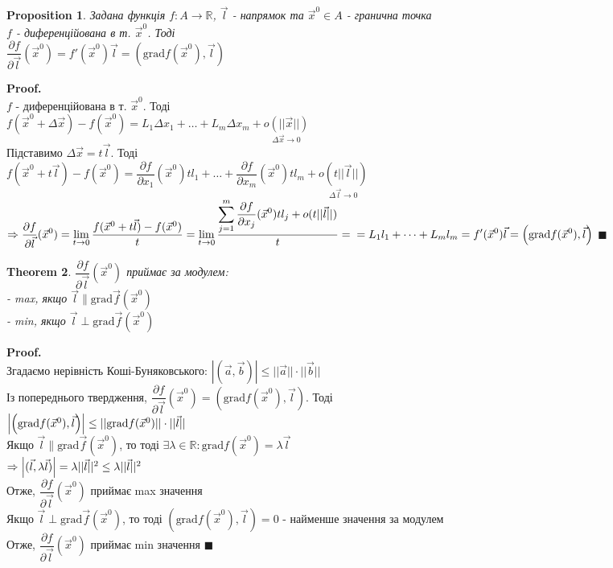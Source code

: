 \documentclass[a4paper, 14pt]{extarticle}
\def\huge{\displaystyle}
\theoremstyle{theoremdd}
\newtheorem{theorem}{Theorem}[subsection]
\theoremstyle{theoremdd}
\theoremstyle{theoremdd}
\newtheorem{proposition}[theorem]{Proposition}
\theoremstyle{theoremdd}
\theoremstyle{theoremdd}
\theoremstyle{theoremdd}
\theoremstyle{theoremdd}
\newenvironment{pf}{\vspace*{-3mm} \textbf{Proof. \\}}{$\blacksquare$}
\begin{document}
\begin{proposition}
Задана функція $f: A \to \mathbb{R}$, $\vec{l}$ - напрямок та $\vec{x}^0 \in A$ - гранична точка\\
$f$ - диференційована в т. $\vec{x}^0$. Тоді\\
$\dfrac{\partial f}{\partial \vec{l}}(\vec{x}^0) = f'(\vec{x}^0) \vec{l} = \left(\textrm{grad} f(\vec{x}^0), \vec{l} \right)$
\end{proposition}
\begin{pf}
$f$ - диференційована в т. $\vec{x}^0$. Тоді \\ $f(\vec{x}^0 + \Delta \vec{x}) - f(\vec{x}^0) = L_1 \Delta x_1 + \dots + L_m \Delta x_m + \underset{\Delta \vec{x} \to 0}{o(||\vec{x}||)}$\\
Підставимо $\Delta \vec{x} = t \vec{l}$. Тоді\\
$f(\vec{x}^0 + t \vec{l}) - f(\vec{x}^0) = \dfrac{\partial f}{\partial x_1} (\vec{x}^0) tl_1 + \dots + \dfrac{\partial f}{\partial x_m} (\vec{x}^0) t l_m + \underset{\Delta \vec{l} \to 0}{o(t || \vec{l}||)}$\\
$\Rightarrow \huge \dfrac{\partial f}{\partial \vec{l}}(\vec{x}^0) = \lim_{t \to 0} \dfrac{f(\vec{x}^0 + t \vec{l}) - f(\vec{x}^0)}{t} = \lim_{t \to 0} \dfrac{\huge \sum_{j=1}^m \dfrac{\partial f}{\partial x_j}(\vec{x}^0)tl_j + o(t||\vec{l}||)}{t} = \\ = L_1 l_1 + \dots + L_m l_m = f'(\vec{x}^0) \vec{l} = \left( \textrm{grad} f(\vec{x}^0), \vec{l} \right)$
\end{pf}

\begin{theorem}
$\dfrac{\partial f}{\partial \vec{l}}(\vec{x}^0)$ приймає за модулем:\\
- max, якщо $\vec{l} \parallel \textrm{grad} \vec{f}(\vec{x}^0)$\\
- min, якщо $\vec{l} \perp \textrm{grad} \vec{f}(\vec{x}^0)$
\end{theorem}
\begin{pf}
Згадаємо нерівність Коші-Буняковського: $|(\vec{a}, \vec{b})| \leq ||\vec{a}|| \cdot ||\vec{b}||$\\
Із попереднього твердження, $\dfrac{\partial f}{\partial \vec{l}}(\vec{x}^0) = \left( \textrm{grad} f(\vec{x}^0), \vec{l} \right)$. Тоді\\
$\abs{\left( \textrm{grad} f(\vec{x}^0), \vec{l} \right)} \leq || \textrm{grad}f(\vec{x}^0) || \cdot ||\vec{l} ||$\\
Якщо $\vec{l} \parallel \textrm{grad} \vec{f}(\vec{x}^0)$, то тоді $\exists \lambda \in \mathbb{R}: \textrm{grad} f(\vec{x}^0) = \lambda \vec{l}$\\
$\Rightarrow \abs{(\vec{l}, \lambda \vec{l})} = \lambda || \vec{l} ||^2 \leq \lambda || \vec{l} ||^2$\\
Отже, $\dfrac{\partial f}{\partial \vec{l}}(\vec{x}^0)$ приймає max значення\\
Якщо $\vec{l} \perp \textrm{grad} \vec{f}(\vec{x}^0)$, то тоді $\left(\textrm{grad} f(\vec{x}^0), \vec{l} \right) = 0$ - найменше значення за модулем\\
Отже, $\dfrac{\partial f}{\partial \vec{l}}(\vec{x}^0)$ приймає min значення
\end{pf}
\\
\end{document}
